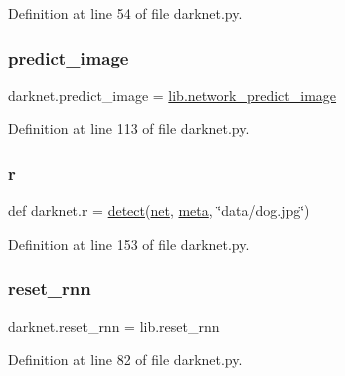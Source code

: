 Definition at line 54 of file darknet.\+py.

\mbox{\label{namespacedarknet_a23869a65defd0266abc31c599b99f94b}} 
\subsubsection{\texorpdfstring{predict\_image}{predict\_image}}
{\footnotesize\ttfamily darknet.\+predict\+\_\+image = \mbox{\hyperlink{network_8c_a4b4357e916774cc72d7a37ec35a1e1ba}{lib.\+network\+\_\+predict\+\_\+image}}}



Definition at line 113 of file darknet.\+py.

\mbox{\label{namespacedarknet_aa63511145b33161bf394732457420be6}} 
\subsubsection{\texorpdfstring{r}{r}}
{\footnotesize\ttfamily def darknet.\+r = \mbox{\hyperlink{namespacedarknet_a7d3eaf0113e0b328013aa81edaad9f91}{detect}}(\mbox{\hyperlink{namespacedarknet_adc6a45d045e33aea7cdb3d217a6a7d35}{net}}, \mbox{\hyperlink{namespacedarknet_ae61a1edabe435136c755d64a6183a9c0}{meta}}, \char`\"{}data/dog.\+jpg\char`\"{})}



Definition at line 153 of file darknet.\+py.

\mbox{\label{namespacedarknet_a3b81bfa75dea1539c68ceea4e8e1d1ab}} 
\subsubsection{\texorpdfstring{reset\_rnn}{reset\_rnn}}
{\footnotesize\ttfamily darknet.\+reset\+\_\+rnn = lib.\+reset\+\_\+rnn}



Definition at line 82 of file darknet.\+py.

\mbox{\label{namespacedarknet_a236a643b258c1e18e3051a0460b4717d}} 
